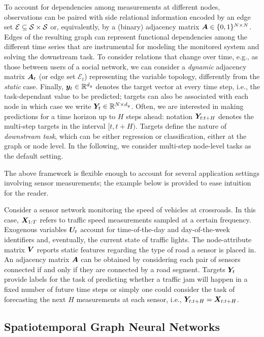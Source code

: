 To account for dependencies among measurements at different nodes, observations can be paired with side relational information encoded by an edge set $\mathcal E\subseteq \mathcal{S}\times \mathcal{S}$ or, equivalently, by a (binary) adjacency matrix ${\bm{A}}\in\{0,1\}^{N\times N}$. Edges of the resulting graph can represent functional dependencies among the different time series that are instrumental for modeling the monitored system and solving the downstream task.
To consider relations that change over time, e.g., as those between users of a social network, we can consider a \emph{dynamic} adjacency matrix ${\bm{A}}_t$ (or edge set $\mathcal E_t$) representing the variable topology, differently from the \emph{static} case. Finally, ${\bm{y}}_t \in {\mathbb{R}}^{d_y}$ denotes the target vector at every time step, i.e., the task-dependant value to be predicted; targets can also be associated with each node in which case we write ${\bm{Y}}_t \in {\mathbb{R}}^{N\times d_y}$.
Often, we are interested in making predictions for a time horizon up to $H$ steps ahead: notation ${\bm{Y}}_{t:t+H}$ denotes the multi-step targets in the interval $[t,t+H)$. Targets define the nature of \emph{downstream task}, which can be either regression or classification, either at the graph or node level. In the following, we consider multi-step node-level tasks as the default setting. 

The above framework is flexible enough to account for several application settings involving sensor measurements; the example below is provided to ease intuition for the reader.
\begin{example} Consider a sensor network monitoring the speed of vehicles at crossroads. In this case, ${\bm{X}}_{1:T}$ refers to traffic speed measurements sampled at a certain frequency. Exogenous variables ${\bm{U}}_t$ account for time-of-the-day and day-of-the-week identifiers and, eventually, the current state of traffic lights. The node-attribute matrix ${\bm{V}}$ reports static features regarding the type of road a sensor is placed in. An adjacency matrix ${\bm{A}}$ can be obtained by considering each pair of sensors connected if and only if they are connected by a road segment. Targets ${\bm{Y}}_{t}$ provide labels for the task of predicting whether a traffic jam will happen in a fixed number of future time steps or simply one could consider the task of forecasting the next $H$ measurements at each sensor, i.e., ${\bm{Y}}_{t:t+H} = {\bm{X}}_{t:t+H}$.
\end{example}


\subsection{Spatiotemporal Graph Neural Networks}\label{s:stgn}

